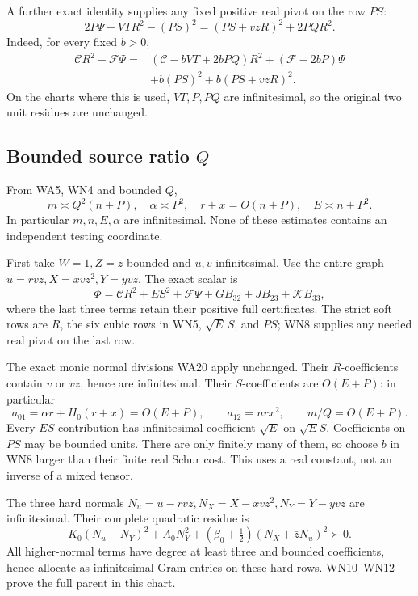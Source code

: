 A further exact identity supplies any fixed positive real pivot
on the row \(PS\):
\[
 2P\Psi+VT R^2-(PS)^2=(PS+vzR)^2+2PQR^2.
 \tag{WN7}
\]
Indeed, for every fixed \(b>0\),
\[
\begin{split}
 \mathcal C R^2+\mathcal F\Psi={}&
 (\mathcal C-bVT+2bPQ)R^2+(\mathcal F-2bP)\Psi\\
 &+b(PS)^2+b(PS+vzR)^2.
\end{split}\tag{WN8}
\]
On the charts where this is used, \(VT,P,PQ\) are infinitesimal,
so the original two unit residues are unchanged.

\subsection{Bounded source ratio \(Q\)}

From WA5, WN4 and bounded \(Q\),
\[
 m\asymp Q^2(n+P),\quad \alpha\asymp P^2,\quad
 r+x=O(n+P),\quad E\asymp n+P^2.
 \tag{WN9}
\]
In particular \(m,n,E,\alpha\) are infinitesimal. None of these
estimates contains an independent testing coordinate.

First take \(W=1,Z=z\) bounded and \(u,v\) infinitesimal. Use the
entire graph \(u=rvz,X=xvz^2,Y=yvz\). The exact scalar is
\[
 \Phi=\mathcal CR^2+ES^2+\mathcal F\Psi
          +GB_{32}+JB_{23}+\mathcal K B_{33},
 \tag{WN10}
\]
where the last three terms retain their positive full certificates.
The strict soft rows are \(R\), the six cubic rows in WN5,
\(\sqrt E\,S\), and \(PS\); WN8 supplies any needed real pivot
on the last row.

The exact monic normal divisions WA20 apply unchanged.
Their \(R\)-coefficients contain \(v\) or \(vz\), hence are
infinitesimal. Their \(S\)-coefficients are \(O(E+P)\):
in particular
\[
 a_{01}=\alpha r+H_0(r+x)=O(E+P),\qquad
 a_{12}=nr x^2,\qquad m/Q=O(E+P).
 \tag{WN11}
\]
Every \(ES\) contribution has infinitesimal coefficient \(\sqrt E\)
on \(\sqrt E S\). Coefficients on \(PS\) may be bounded units.
There are only finitely many of them, so choose \(b\) in WN8
larger than their finite real Schur cost. This uses a real constant,
not an inverse of a mixed tensor.

The three hard normals
\(N_u=u-rvz,N_X=X-xvz^2,N_Y=Y-yvz\) are infinitesimal.
Their complete quadratic residue is
\[
 K_0(N_u-N_Y)^2+A_0N_Y^2+
          (\beta_0+\tfrac12)(N_X+\bar zN_u)^2\succ0.
 \tag{WN12}
\]
All higher-normal terms have degree at least three and bounded
coefficients, hence allocate as infinitesimal Gram entries on these
hard rows. WN10--WN12 prove the full parent in this chart.

